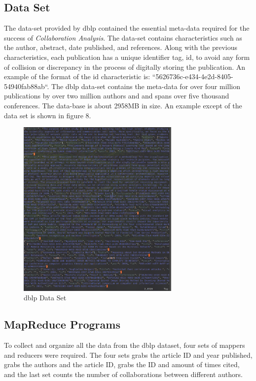 \documentclass[10pt,journal,compsoc]{IEEEtran}
\begin{document}
\subsection{Data Set}
The data-set provided by dblp contained the essential meta-data required for the success of \textit{Collaboration Analysis}. The data-set contains characteristics such as the author, abstract, date published, and references. Along with the previous characteristics, each publication has a unique identifier tag, id, to avoid any form of collision or discrepancy in the process of digitally storing the publication. An example of the format of the id characteristic is: ``5626736c-e434-4e2d-8405-54940fab88ab``. The dblp data-set contains the meta-data for over four million publications by over two million authors and and spans over five thousand conferences. The data-base is about 2958MB in size. An example except of the data set is shown in figure 8.

\begin{figure}[htp]
\centering
\includegraphics[width=7.9cm]{Images/dblp-data.png}
\caption{dblp Data Set}
\label{fig:}
\end{figure}


\subsection{MapReduce Programs}
\indent To collect and organize all the data from the dblp dataset, four sets of mappers and reducers were required. The four sets grabs the article ID and year published, grabs the authors and the article ID, grabs the ID and amount of times cited, and the last set counts the number of collaborations between different authors.
\end{document}
